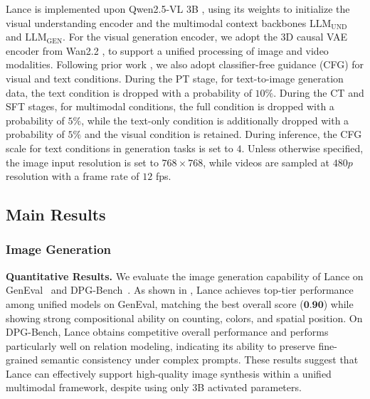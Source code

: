 
Lance is implemented upon Qwen2.5-VL 3B \cite{Qwen2.5-VL}, using its weights to initialize the visual understanding encoder and the multimodal context backbones $\mathrm{LLM}_{\mathrm{UND}}$ and $\mathrm{LLM}_{\mathrm{GEN}}$. For the visual generation encoder, we adopt the 3D causal VAE encoder from Wan2.2 \cite{wan2025wan}, to support a unified processing of image and video modalities.
Following prior work \cite{ho2022classifier}, we also adopt classifier-free guidance (CFG) for visual and text conditions. During the PT stage, for text-to-image generation data, the text condition is dropped with a probability of $10\%$.
During the CT and SFT stages, for multimodal conditions, the full condition is dropped with a probability of $5\%$, while the text-only condition is additionally dropped with a probability of $5\%$ and the visual condition is retained.
During inference, the CFG scale for text conditions in generation tasks is set to $4$. Unless otherwise specified, the image input resolution is set to $768 \times 768$, while videos are sampled at $480p$ resolution with a frame rate of $12$ fps.



\subsection{Main Results}




\subsubsection{Image Generation}

\textbf{Quantitative Results.}
We evaluate the image generation capability of Lance on GenEval~\cite{ghosh2023geneval} and DPG-Bench~\cite{hu2024ella}. As shown in , Lance achieves top-tier performance among unified models on GenEval, matching the best overall score ($\textbf{0.90}$) while showing strong compositional ability on counting, colors, and spatial position. On DPG-Bench, Lance obtains competitive overall performance and performs particularly well on relation modeling, indicating its ability to preserve fine-grained semantic consistency under complex prompts. These results suggest that Lance can effectively support high-quality image synthesis within a unified multimodal framework, despite using only $3$B activated parameters.




